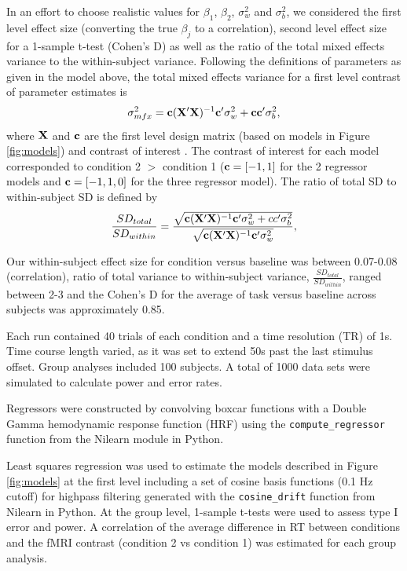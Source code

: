 \documentclass[titlepage,12pt] {article}
\begin{document}
In an effort to choose realistic values for $\beta_1$, $\beta_2$, $\sigma^2_w$ and $\sigma^2_b$, we considered the first level effect size (converting the true $\beta_j$ to a  correlation), second level effect size for a 1-sample t-test (Cohen's D) as well as the ratio of the total mixed effects variance to the within-subject variance.  Following the definitions of parameters as given in the model above, the total mixed effects variance for a first level contrast of parameter estimates is
\begin{equation} \label{eq:mfxvar}
 \sigma^2_{mfx} =  \vb{c}(\vb{X}'\vb{X})^{-1}\vb{c}'\sigma^2_{w} +\vb{c}\vb{c}'\sigma^2_b,
\end{equation}
where $\vb{X}$ and $\vb{c}$ are the first level design matrix (based on models in Figure \ref{fig:models}) and contrast of interest \citep{mumford_modeling_2006}.  The contrast of interest for each model corresponded to condition 2 $>$ condition 1 ($\vb{c}=[-1,1]$ for the 2 regressor models and $\vb{c}=[-1,1, 0]$ for the three regressor model).  The ratio of total SD to within-subject SD is defined by
\begin{equation}\label{eq:sd_ratio}
\frac{SD_{total}}{SD_{within}} = \frac{\sqrt{\vb{c}(\vb{X}'\vb{X})^{-1}\vb{c}'\sigma^2_{w} + cc'\sigma^2_b}} {\sqrt{\vb{c}(\vb{X}'\vb{X})^{-1}\vb{c}'\sigma^2_{w}}},
\end{equation}

Our within-subject effect size for condition versus baseline was between 0.07-0.08 (correlation), ratio of total variance to within-subject variance, $\frac{SD_{total}}{SD_{within}}$,  ranged between 2-3 and the Cohen's D for the average of task versus baseline across subjects was approximately 0.85.

Each run contained 40 trials of each condition and a time resolution (TR) of 1s.  Time course length varied, as it was set to extend 50s past the last stimulus offset.  Group analyses included 100 subjects.  A total of 1000 data sets were simulated to calculate power and error rates. 


Regressors were constructed by convolving boxcar functions with a Double Gamma hemodynamic response function (HRF) using the \verb+compute_regressor+ function from the Nilearn module in Python.  

Least squares regression was used to estimate the models described in Figure \ref{fig:models} at the first level including a set of cosine basis functions (0.1 Hz cutoff) for highpass filtering generated with the \verb+cosine_drift+ function from Nilearn in Python.  At the group level, 1-sample t-tests were used to assess type I error and power.  A correlation of the average difference in RT between conditions and the fMRI contrast (condition 2 vs condition 1) was estimated for each group analysis.  
\end{document}
